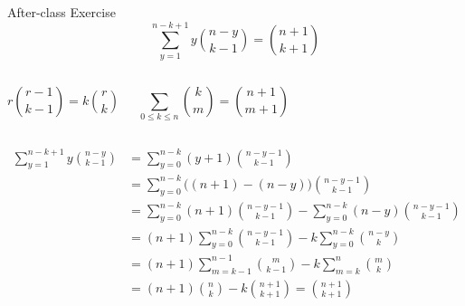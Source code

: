 \begin{frame}{}
  \begin{exampleblock}{After-class Exercise}
    \[
      \sum_{y=1}^{n-k+1} y \binom{n-y}{k-1} = \binom{n+1}{k+1}
    \]
  \end{exampleblock}

  \begin{columns}
      \[
	r \binom{r-1}{k-1} = k \binom{r}{k}
      \]

      \vspace{0.60cm}
      \[
	\sum_{0 \le k \le n} \binom{k}{m} = \binom{n+1}{m+1}
      \]
  \end{columns}
\end{frame}

\begin{frame}{}
  \begin{align*}
    \sum_{y=1}^{n-k+1} y \binom{n-y}{k-1} &= \sum_{y=0}^{n-k} (y+1) \binom{n-y-1}{k-1} \\
    &= \sum_{y=0}^{n-k} \big((n+1) - (n-y)\big) \binom{n-y-1}{k-1} \\
    &= \sum_{y=0}^{n-k} (n+1) \binom{n-y-1}{k-1} - \sum_{y=0}^{n-k} (n-y) \binom{n-y-1}{k-1} \\
    &= (n+1) \sum_{y=0}^{n-k}\binom{n-y-1}{k-1} - k \sum_{y=0}^{n-k} \binom{n-y}{k} \\
    &= (n+1) \sum_{m=k-1}^{n-1}\binom{m}{k-1} - k \sum_{m=k}^{n} \binom{m}{k} \\
    &= (n+1) \binom{n}{k} - k \binom{n+1}{k+1} = \binom{n+1}{k+1}
  \end{align*}
\end{frame}

\begin{frame}{}
  \centerline{}
\end{frame}

\begin{frame}{}
\end{frame}
